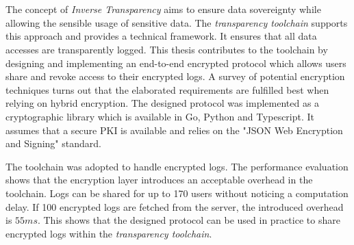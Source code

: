 \documentclass[../main.tex]{subfiles}
\begin{document}
\chapter*{\myAbstractTitle}

The concept of \emph{Inverse Transparency} aims to ensure data sovereignty while allowing the sensible usage of sensitive data.
The \emph{transparency toolchain} supports this approach and provides a technical framework.
It ensures that all data accesses are transparently logged.
This thesis contributes to the toolchain by designing and implementing an end-to-end encrypted protocol which allows users share and revoke access to their encrypted logs.
A survey of potential encryption techniques turns out that the elaborated requirements are fulfilled best when relying on hybrid encryption.
The designed protocol was implemented as a cryptographic library which is available in Go, Python and Typescript.
It assumes that a secure PKI is available and relies on the "JSON Web Encryption and Signing" standard.

The toolchain was adopted to handle encrypted logs.
The performance evaluation shows that the encryption layer introduces an acceptable overhead in the toolchain.
Logs can be shared for up to 170 users without noticing a computation delay.
If 100 encrypted logs are fetched from the server, the introduced overhead is $55ms$.
This shows that the designed protocol can be used in practice to share encrypted logs within the \emph{transparency toolchain}.
\end{document}
